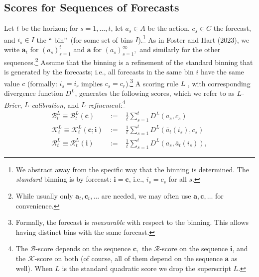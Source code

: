 \documentclass[12pt,a4paper,notitlepage]{article}
\begin{document}
\subsection{Scores for Sequences of Forecasts\label{sus:sequences}}

Let $t$ be the horizon; for $s=1,\ldots ,t$, let $a_{s}\in A$ be the action, 
$c_{s}\in C$ the forecast, and $i_{s}\in I$ the \textquotedblleft
bin\textquotedblright\ (for some set of bins $I$).\footnote{%
We abstract away from the specific way that the binning is determined. The 
\emph{standard} binning is by forecast: $\mathbf{i}=\mathbf{c}$, i.e., $%
i_{s}=c_{s}$ for all $s$.} As in Foster and Hart (2023), we write $\mathbf{a}%
_{t}$ for $(a_{s})_{s=1}^{t}$ and $\mathbf{a}$ for $(a_{s})_{s=1}^{\infty },$
and similarly for the other sequences.\footnote{%
While usually only $\mathbf{a}_{t},\mathbf{c}_{t},\ldots $ are needed, we
may often use $\mathbf{a},\mathbf{c},\ldots $ for convenience.} Assume that
the binning is a refinement of the standard binning that is generated by the
forecasts; i.e., all forecasts in the same bin $i$ have the same value $c$
(formally: $i_{s}=i_{r}$ implies $c_{s}=c_{r}$).\footnote{%
Formally, the forecast is \emph{measurable} with respect to the binning.
This allows having distinct bins with the same forecast.} A scoring rule $L$%
, with corresponding divergence function $D^{L}$, generates the following
scores, which we refer to as $L$\emph{-Brier}, $L$\emph{-calibration}, and $%
L $\emph{-refinement}:\footnote{%
The $\mathcal{B}$-score depends on the sequence $\mathbf{c},$ the $\mathcal{R%
}$-score on the sequence $\mathbf{i}$, and the $\mathcal{K}$-score on both
(of course, all of them depend on the sequence $\mathbf{a}$ as well). When $%
L $ is the standard quadratic score we drop the superscript $L$.}%
\begin{eqnarray*}
\mathcal{B}_{t}^{L}\equiv \mathcal{B}_{t}^{L}(\mathbf{c}) &%
{\;:=\;}%
&\frac{1}{t}\sum_{s=1}^{t}D^{L}(a_{s},c_{s}) \\
\mathcal{K}_{t}^{L}\equiv \mathcal{K}_{t}^{L}(\mathbf{c};\mathbf{i}) &%
{\;:=\;}%
&\frac{1}{t}\sum_{s=1}^{t}D^{L}(\bar{a}_{t}(i_{s}),c_{s}) \\
\mathcal{R}_{t}^{L}\equiv \mathcal{R}_{t}^{L}(\mathbf{i}) &%
{\;:=\;}%
&\frac{1}{t}\sum_{s=1}^{t}D^{L}(a_{s},\bar{a}_{t}(i_{s})),
\end{eqnarray*}%
\end{document}
